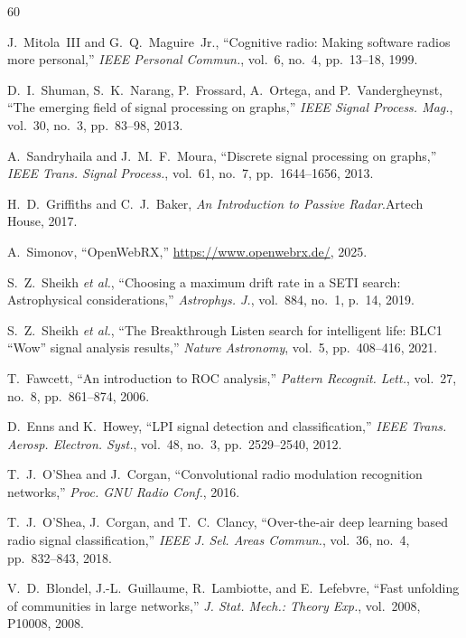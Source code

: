 \documentclass[sensors,article,submit,pdftex]{mdpi}
\begin{document}
\begin{thebibliography}{60}

J.~Mitola~III and G.~Q.~Maguire~Jr., ``Cognitive radio: Making software radios more personal,'' \textit{IEEE Personal Commun.}, vol.~6, no.~4, pp.~13--18, 1999.

D.~I.~Shuman, S.~K.~Narang, P.~Frossard, A.~Ortega, and P.~Vandergheynst, ``The emerging field of signal processing on graphs,'' \textit{IEEE Signal Process. Mag.}, vol.~30, no.~3, pp.~83--98, 2013.

A.~Sandryhaila and J.~M.~F.~Moura, ``Discrete signal processing on graphs,'' \textit{IEEE Trans. Signal Process.}, vol.~61, no.~7, pp.~1644--1656, 2013.

H.~D.~Griffiths and C.~J.~Baker, \textit{An Introduction to Passive Radar}.\quad Artech House, 2017.

A.~Simonov, ``OpenWebRX,'' \url{https://www.openwebrx.de/}, 2025.

S.~Z.~Sheikh \textit{et al.}, ``Choosing a maximum drift rate in a SETI search: Astrophysical considerations,'' \textit{Astrophys. J.}, vol.~884, no.~1, p.~14, 2019.

S.~Z.~Sheikh \textit{et al.}, ``The Breakthrough Listen search for intelligent life: BLC1 ``Wow'' signal analysis results,'' \textit{Nature Astronomy}, vol.~5, pp.~408--416, 2021.

T.~Fawcett, ``An introduction to ROC analysis,'' \textit{Pattern Recognit. Lett.}, vol.~27, no.~8, pp.~861--874, 2006.

D.~Enns and K.~Howey, ``LPI signal detection and classification,'' \textit{IEEE Trans. Aerosp. Electron. Syst.}, vol.~48, no.~3, pp.~2529--2540, 2012.

T.~J.~O'Shea and J.~Corgan, ``Convolutional radio modulation recognition networks,'' \textit{Proc. GNU Radio Conf.}, 2016.

T.~J.~O'Shea, J.~Corgan, and T.~C.~Clancy, ``Over-the-air deep learning based radio signal classification,'' \textit{IEEE J. Sel. Areas Commun.}, vol.~36, no.~4, pp.~832--843, 2018.

V.~D.~Blondel, J.-L.~Guillaume, R.~Lambiotte, and E.~Lefebvre, ``Fast unfolding of communities in large networks,'' \textit{J. Stat. Mech.: Theory Exp.}, vol.~2008, P10008, 2008.


\end{thebibliography}
\end{document}
